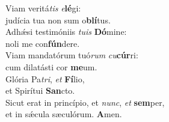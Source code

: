 \evenverse Viam veritá\textit{tis} \textit{e}\textbf{lé}gi:~\*\\
\evenverse judícia tua non sum o\textbf{blí}tus.\\
\oddverse Adhǽsi testimóniis \textit{tu}\textit{is} \textbf{Dó}mine:~\*\\
\oddverse noli me con\textbf{fún}dere.\\
\evenverse Viam mandatórum tuó\textit{rum} \textit{cu}\textbf{cúr}ri:~\*\\
\evenverse cum dilatásti cor \textbf{me}um.\\
\oddverse Glória Pa\textit{tri}, \textit{et} \textbf{Fí}lio,~\*\\
\oddverse et Spirítui \textbf{San}cto.\\
\evenverse Sicut erat in princípio, et \textit{nunc}, \textit{et} \textbf{sem}per,~\*\\
\evenverse et in sǽcula sæculórum. \textbf{A}men.\\
